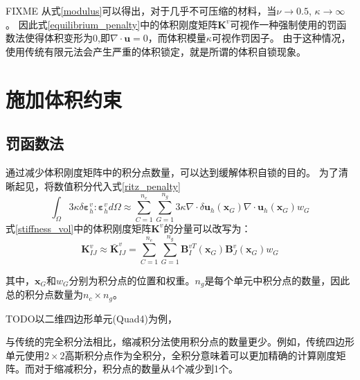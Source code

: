 FIXME
从式\eqref{modulus}可以得出，对于几乎不可压缩的材料，当$\nu \rightarrow 0.5$, $\kappa \rightarrow \infty$。
因此式\eqref{equilibrium_penalty}中的体积刚度矩阵$\boldsymbol K^v$可视作一种强制使用的罚函数法使得体积变形为$0$,即$\nabla \cdot \boldsymbol u = 0$，而体积模量$\kappa$可视作罚因子。
由于这种情况，使用传统有限元法会产生严重的体积锁定，就是所谓的体积自锁现象。


\section{施加体积约束}
\subsection{罚函数法}

通过减少体积刚度矩阵中的积分点数量，可以达到缓解体积自锁的目的。
为了清晰起见，将数值积分代入式\eqref{ritz_penalty}
\begin{equation}
    \int_\Omega 3\kappa \delta \boldsymbol \varepsilon^v_h : \boldsymbol \varepsilon^v_h d\Omega \approx
    \sum_{C=1}^{n_e}\sum_{G=1}^{n_g} 3\kappa \nabla \cdot \delta \boldsymbol u_h(\boldsymbol x_G) \nabla \cdot \boldsymbol u_h(\boldsymbol x_G) w_G
\end{equation}
式\eqref{stiffness_vol}中的体积刚度矩阵$\boldsymbol K^v$的分量可以改写为：
\begin{equation}
    \boldsymbol K^v_{IJ} \approx \bar{\boldsymbol K}^v_{IJ} = \sum_{C=1}^{n_e}\sum_{G=1}^{n_g} \boldsymbol B^{vT}_I(\boldsymbol x_G) \boldsymbol B_J^v(\boldsymbol x_G) w_G
\end{equation}

其中，$\boldsymbol x_G$和$w_G$分别为积分点的位置和权重。$n_g$是每个单元中积分点的数量，因此总的积分点数量为$n_c \times n_g$。

TODO以二维四边形单元(Quad4)为例，

与传统的完全积分法相比，缩减积分法使用积分点的数量更少。例如，传统四边形单元使用$2\times2$高斯积分点作为全积分，全积分意味着可以更加精确的计算刚度矩阵。而对于缩减积分，积分点的数量从4个减少到1个。

